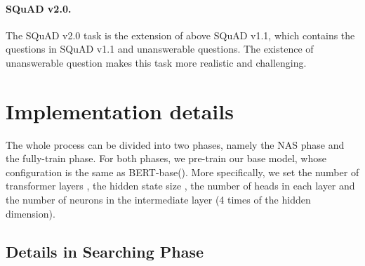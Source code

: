 \documentclass[letterpaper]{article} \usepackage{aaai22}  \usepackage{times}  \usepackage{helvet}  \usepackage{courier}  \usepackage[hyphens]{url}  \usepackage{graphicx} \urlstyle{rm} \def\UrlFont{\rm}  \usepackage{natbib}  \usepackage{caption} \DeclareCaptionStyle{ruled}{labelfont=normalfont,labelsep=colon,strut=off} \frenchspacing  \setlength{\pdfpagewidth}{8.5in}  \setlength{\pdfpageheight}{11in}  \usepackage{algorithm}
\begin{document}
\paragraph{SQuAD v2.0.}
The SQuAD v2.0 task is the extension of above SQuAD v1.1, which contains the  questions in SQuAD v1.1 and  unanswerable questions. The existence of unanswerable question makes this task more realistic and challenging. 



\begin{table}[h]
\vspace{-2mm}
\vspace{-3mm}
\begin{center}
\caption{Hyperparameters for pre-training.}\label{tab:pretrain_implementation_details}
\end{center}
\vspace{-5mm}
\end{table}


\section{Implementation details}

The whole process can be divided into two phases, namely the NAS phase and the fully-train phase. For both phases, we pre-train our base model, whose configuration is the same as BERT-base(). More specifically, we set the number of transformer layers , the hidden state size , the number of heads in each layer  and the number of neurons in the intermediate layer  (4 times of the hidden dimension).

\subsection{Details in Searching Phase}
\end{document}
